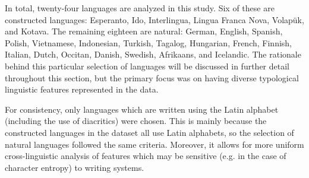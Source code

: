 \documentclass[12pt,a4paper]{article}
\numberwithin{figure}{section}
\numberwithin{table}{section}
\numberwithin{definition}{section}
\begin{document}
In total, twenty-four languages are analyzed in this study. Six of these are constructed languages: Esperanto, Ido, Interlingua, Lingua Franca Nova, Volapük, and Kotava. The remaining eighteen are natural: German, English, Spanish, Polish, Vietnamese, Indonesian, Turkish, Tagalog, Hungarian, French, Finnish, Italian, Dutch, Occitan, Danish, Swedish, Afrikaans, and Icelandic. The rationale behind this particular selection of languages will be discussed in further detail throughout this section, but the primary focus was on having diverse typological linguistic features represented in the data.

For consistency, only languages which are written using the Latin alphabet (including the use of diacritics) were chosen. This is mainly because the constructed languages in the dataset all use Latin alphabets, so the selection of natural languages followed the same criteria. Moreover, it allows for more uniform cross-linguistic analysis of features which may be sensitive (e.g. in the case of character entropy) to writing systems.

\end{document}
